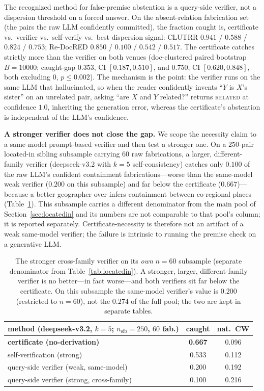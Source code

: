 \documentclass[11pt,letterpaper]{article}
\begin{document}
The recognized method for false-premise abstention is a query-side verifier, not a dispersion threshold on a forced answer. On the absent-relation fabrication set (the pairs the raw LLM confidently committed), the fraction caught is, certificate vs.\ verifier vs.\ self-verify vs.\ best dispersion signal: CLUTRR $0.941$ / $0.588$ / $0.824$ / $0.753$; Re-DocRED $0.850$ / $0.100$ / $0.542$ / $0.517$. The certificate catches strictly more than the verifier on both venues (doc-clustered paired bootstrap $B{=}10000$; caught-gap $0.353$, CI $[0.187,0.510]$, and $0.750$, CI $[0.620,0.848]$, both excluding $0$, $p\leq 0.002$). The mechanism is the point: the verifier runs on the same LLM that hallucinated, so when the reader confidently invents ``$Y$ is $X$'s sister'' on an unrelated pair, asking ``are $X$ and $Y$ related?'' returns \textsc{related} at confidence $1.0$, inheriting the generation error, whereas the certificate's abstention is independent of the LLM's confidence.

\textbf{A stronger verifier does not close the gap.} We scope the necessity claim to a same-model prompt-based verifier and then test a stronger one. On a $250$-pair located-in sibling subsample carrying $60$ raw fabrications, a larger, different-family verifier (deepseek-v3.2 with $k{=}5$ self-consistency) catches only $0.100$ of the raw LLM's confident containment fabrications---worse than the same-model weak verifier ($0.200$ on this subsample) and far below the certificate ($0.667$)---because a better geographer over-infers containment between co-regional places (Table~\ref{tab:stronger}). This subsample carries a different denominator from the main pool of Section~\ref{sec:locatedin} and its numbers are not comparable to that pool's column; it is reported separately. Certificate-necessity is therefore not an artifact of a weak same-model verifier; the failure is intrinsic to running the premise check on a generative LLM.

\begin{table}[t]
\centering
\small
\begin{tabular}{lcc}
\hline
method (deepseek-v3.2, $k{=}5$; $n_{\text{sib}}{=}250$, $60$ fab.) & caught & nat.\ CW \\
\hline
\textbf{certificate (no-derivation)} & \textbf{0.667} & 0.096 \\
self-verification (strong) & 0.533 & 0.112 \\
query-side verifier (weak, same-model) & 0.200 & 0.192 \\
query-side verifier (strong, cross-family) & 0.100 & 0.216 \\
\hline
\end{tabular}
\caption{The stronger cross-family verifier on its \emph{own} $n{=}60$ subsample (separate denominator from Table~\ref{tab:locatedin}). A stronger, larger, different-family verifier is no better---in fact worse---and both verifiers sit far below the certificate. On this subsample the same-model verifier's value is $0.200$ (restricted to $n{=}60$), not the $0.274$ of the full pool; the two are kept in separate tables.}
\label{tab:stronger}
\end{table}
\end{document}
